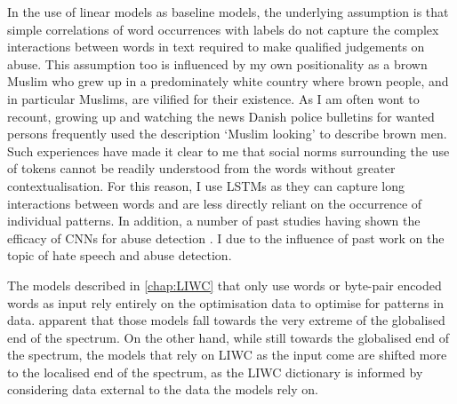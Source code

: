 In the use of linear models as baseline models, the underlying assumption  is that simple correlations of word occurrences with labels do not capture the complex interactions between words in text required to make qualified judgements on abuse.
This assumption too is influenced by my own positionality as a brown Muslim who grew up in a predominately white country where brown people, and in particular Muslims, are vilified for their existence.
As I am often wont to recount, growing up and watching the news Danish police bulletins for wanted persons frequently used the description `Muslim looking' to describe brown men.
Such experiences have made it clear to me that social norms surrounding the use of tokens cannot be readily understood from the words  without greater contextualisation.
For this reason, I use LSTMs as they can capture long interactions between words and are less directly reliant on the occurrence of individual patterns.
In addition, a number of past studies having shown the efficacy of CNNs for abuse detection \citep{Park:2017, Mitchell:2019,Kolhatkar:2020,Rizwan:2020,Safaya:2020,Gamback:2017}.
I   due to the influence of past work on the topic of hate speech and abuse detection.

The models described in \autoref{chap:LIWC} that only use words or byte-pair encoded words as input rely entirely on the optimisation data to optimise for patterns in data.
 apparent that those models fall towards the very extreme of the globalised end of the  spectrum.
On the other hand, while still towards the globalised end of the spectrum, the models that rely on LIWC as the input come are shifted more to the localised end of the spectrum, as the LIWC dictionary  is informed by considering data external to the data the models rely on.


